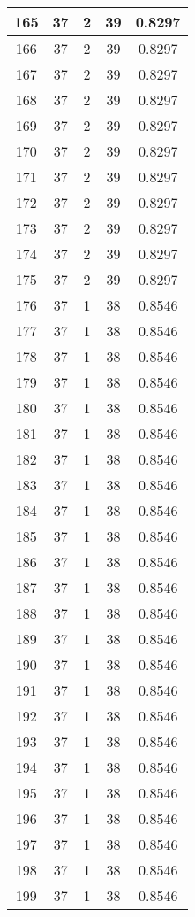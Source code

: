 \documentclass[letterpaper, 12pt]{article}
\begin{document}
\begin{longtable}{|c|c|c|c|c|}
\hline
165 & 37 & 2 & 39 & 0.8297 \\
\hline
166 & 37 & 2 & 39 & 0.8297 \\
\hline
167 & 37 & 2 & 39 & 0.8297 \\
\hline
168 & 37 & 2 & 39 & 0.8297 \\
\hline
169 & 37 & 2 & 39 & 0.8297 \\
\hline
170 & 37 & 2 & 39 & 0.8297 \\
\hline
171 & 37 & 2 & 39 & 0.8297 \\
\hline
172 & 37 & 2 & 39 & 0.8297 \\
\hline
173 & 37 & 2 & 39 & 0.8297 \\
\hline
174 & 37 & 2 & 39 & 0.8297 \\
\hline
175 & 37 & 2 & 39 & 0.8297 \\
\hline
176 & 37 & 1 & 38 & 0.8546 \\
\hline
177 & 37 & 1 & 38 & 0.8546 \\
\hline
178 & 37 & 1 & 38 & 0.8546 \\
\hline
179 & 37 & 1 & 38 & 0.8546 \\
\hline
180 & 37 & 1 & 38 & 0.8546 \\
\hline
181 & 37 & 1 & 38 & 0.8546 \\
\hline
182 & 37 & 1 & 38 & 0.8546 \\
\hline
183 & 37 & 1 & 38 & 0.8546 \\
\hline
184 & 37 & 1 & 38 & 0.8546 \\
\hline
185 & 37 & 1 & 38 & 0.8546 \\
\hline
186 & 37 & 1 & 38 & 0.8546 \\
\hline
187 & 37 & 1 & 38 & 0.8546 \\
\hline
188 & 37 & 1 & 38 & 0.8546 \\
\hline
189 & 37 & 1 & 38 & 0.8546 \\
\hline
190 & 37 & 1 & 38 & 0.8546 \\
\hline
191 & 37 & 1 & 38 & 0.8546 \\
\hline
192 & 37 & 1 & 38 & 0.8546 \\
\hline
193 & 37 & 1 & 38 & 0.8546 \\
\hline
194 & 37 & 1 & 38 & 0.8546 \\
\hline
195 & 37 & 1 & 38 & 0.8546 \\
\hline
196 & 37 & 1 & 38 & 0.8546 \\
\hline
197 & 37 & 1 & 38 & 0.8546 \\
\hline
198 & 37 & 1 & 38 & 0.8546 \\
\hline
199 & 37 & 1 & 38 & 0.8546 \\
\hline
\end{longtable}
\end{document}
